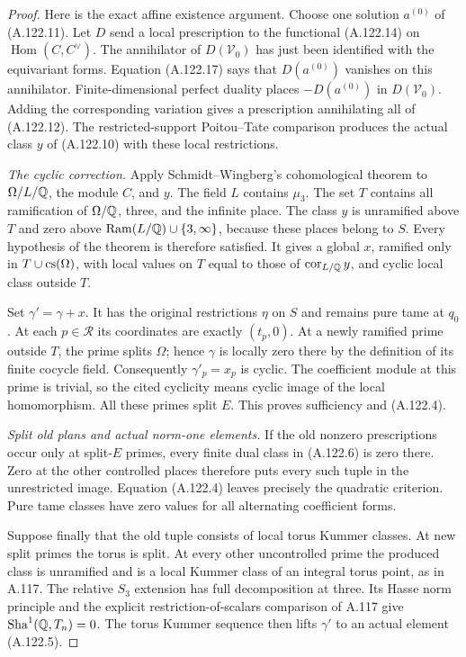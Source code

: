 \begin{proof}
Here is the exact affine existence argument.
Choose one solution \(a^{(0)}\) of (A.122.11).
Let \(D\) send a local prescription to the
functional (A.122.14) on
\(\operatorname{Hom}(C,C^\vee)\).
The annihilator of \(D(\mathcal V_0)\) has
just been identified with the equivariant
forms.  Equation (A.122.17) says that
\(D(a^{(0)})\) vanishes on this annihilator.
Finite-dimensional perfect duality places
\(-D(a^{(0)})\) in \(D(\mathcal V_0)\).
Adding the corresponding variation gives
a prescription annihilating all of (A.122.12).
The restricted-support Poitou--Tate comparison
produces the actual class \(y\) of (A.122.10)
with these local restrictions.

\emph{The cyclic correction.}
Apply Schmidt--Wingberg's cohomological theorem
\cite[Theorem 13, pp.~14--19]{RootSchmidtWingberg1998}
to \(\Omega/L/\mathbb Q\), the module \(C\), and \(y\).
The field \(L\) contains \(\mu_3\).
The set \(T\) contains all ramification of
\(\Omega/\mathbb Q\), three, and the infinite place.
The class \(y\) is unramified above \(T\)
and zero above
\(\operatorname{Ram}(L/\mathbb Q)\cup\{3,\infty\}\),
because these places belong to \(S\).
Every hypothesis of the theorem is therefore
satisfied.
It gives a global \(x\), ramified only in
\(T\cup{\rm cs}(\Omega)\), with local values
on \(T\) equal to those of
\(\operatorname{cor}_{L/\mathbb Q}y\), and cyclic
local class outside \(T\).

Set \(\gamma'=\gamma+x\).
It has the original restrictions \(\eta\)
on \(S\) and remains pure tame at \(q_0\).
At each \(p\in\mathcal R\) its coordinates
are exactly \((t_p,0)\).
At a newly ramified prime outside \(T\),
the prime splits \(\Omega\); hence \(\gamma\)
is locally zero there by the definition of
its finite cocycle field.
Consequently \(\gamma'_p=x_p\) is cyclic.
The coefficient module at this prime is
trivial, so the cited cyclicity means
cyclic image of the local homomorphism.
All these primes split \(E\).
This proves sufficiency and (A.122.4).

\emph{Split old plans and actual norm-one elements.}
If the old nonzero prescriptions occur only
at split-\(E\) primes, every finite dual class
in (A.122.6) is zero there.
Zero at the other controlled places therefore
puts every such tuple in the unrestricted
image.  Equation (A.122.4) leaves precisely
the quadratic criterion.
Pure tame classes have zero values for all
alternating coefficient forms.

Suppose finally that the old tuple consists
of local torus Kummer classes.
At new split primes the torus is split.
At every other uncontrolled prime the
produced class is unramified and is a local
Kummer class of an integral torus point,
as in A.117.
The relative \(S_3\) extension has full
decomposition at three.
Its Hasse norm principle and the explicit
restriction-of-scalars comparison of A.117
give \(\operatorname{Sha}^1(\mathbb Q,T_n)=0\).
The torus Kummer sequence then lifts
\(\gamma'\) to an actual element (A.122.5).
\end{proof}

